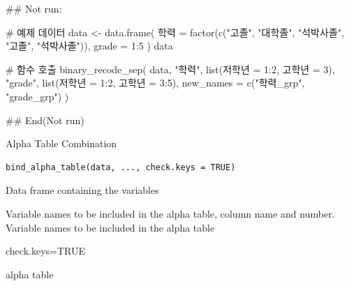 \documentclass[a4paper]{book}
\begin{document}
\begin{Examples}
\begin{ExampleCode}


## Not run: 




# 예제 데이터
data <- data.frame(
  학력 = factor(c("고졸", "대학졸", "석박사졸", "고졸", "석박사졸")),
  grade = 1:5
)
data


# 함수 호출
binary_recode_sep(  data,
                    "학력", list(저학년 = 1:2, 고학년 = 3),
                    "grade", list(저학년 = 1:2, 고학년 = 3:5),
                    new_names = c("학력_grp", "grade_grp")
)





## End(Not run)
\end{ExampleCode}
\end{Examples}
%
\begin{Description}
Alpha Table Combination
\end{Description}
%
\begin{Usage}
\begin{verbatim}
bind_alpha_table(data, ..., check.keys = TRUE)
\end{verbatim}
\end{Usage}
%
\begin{Arguments}
\begin{ldescription}
\item[\code{data}] Data frame containing the variables

\item[\code{...}] Variable names to be included in the alpha table, column name and number. Variable names to be included in the alpha table

\item[\code{check.keys}] check.keys=TRUE
\end{ldescription}
\end{Arguments}
%
\begin{Value}
alpha table
\end{Value}
%
\end{document}
